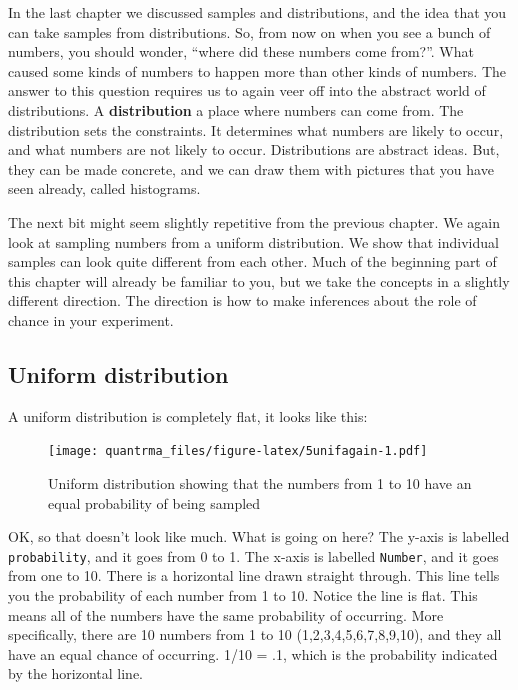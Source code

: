 \documentclass[
]{book}
\begin{document}
In the last chapter we discussed samples and distributions, and the idea that you can take samples from distributions. So, from now on when you see a bunch of numbers, you should wonder, ``where did these numbers come from?''. What caused some kinds of numbers to happen more than other kinds of numbers. The answer to this question requires us to again veer off into the abstract world of distributions. A \textbf{distribution} a place where numbers can come from. The distribution sets the constraints. It determines what numbers are likely to occur, and what numbers are not likely to occur. Distributions are abstract ideas. But, they can be made concrete, and we can draw them with pictures that you have seen already, called histograms.

The next bit might seem slightly repetitive from the previous chapter. We again look at sampling numbers from a uniform distribution. We show that individual samples can look quite different from each other. Much of the beginning part of this chapter will already be familiar to you, but we take the concepts in a slightly different direction. The direction is how to make inferences about the role of chance in your experiment.

\hypertarget{uniform-distribution}{%
\subsection{Uniform distribution}\label{uniform-distribution}}

A uniform distribution is completely flat, it looks like this:

\begin{figure}
\centering
\texttt{[image: quantrma\_files/figure-latex/5unifagain-1.pdf]}
\caption{\label{fig:5unifagain}Uniform distribution showing that the numbers from 1 to 10 have an equal probability of being sampled}
\end{figure}

OK, so that doesn't look like much. What is going on here? The y-axis is labelled \texttt{probability}, and it goes from 0 to 1. The x-axis is labelled \texttt{Number}, and it goes from one to 10. There is a horizontal line drawn straight through. This line tells you the probability of each number from 1 to 10. Notice the line is flat. This means all of the numbers have the same probability of occurring. More specifically, there are 10 numbers from 1 to 10 (1,2,3,4,5,6,7,8,9,10), and they all have an equal chance of occurring. 1/10 = .1, which is the probability indicated by the horizontal line.
\end{document}
